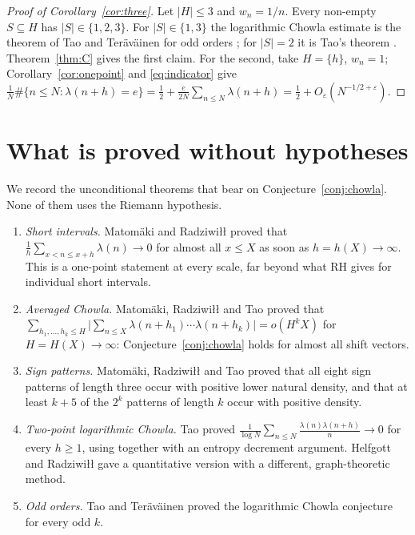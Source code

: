 \documentclass[11pt]{amsart}
\numberwithin{equation}{section}
\theoremstyle{plain}
\theoremstyle{definition}
\theoremstyle{remark}
\begin{document}
\begin{proof}[Proof of Corollary~\ref{cor:three}]
Let $|H|\le3$ and $w_n=1/n$. Every non-empty $S\subseteq H$ has $|S|\in\{1,2,3\}$. For $|S|\in\{1,3\}$ the logarithmic Chowla estimate is the theorem of Tao and Teräväinen for odd orders \cite{TT18,TT19}; for $|S|=2$ it is Tao's theorem \cite{Tao16}. Theorem~\ref{thm:C} gives the first claim. For the second, take $H=\{h\}$, $w_n=1$; Corollary~\ref{cor:onepoint} and \eqref{eq:indicator} give $\frac1N\#\{n\le N:\lambda(n+h)=e\}=\frac12+\frac e{2N}\sum_{n\le N}\lambda(n+h)=\frac12+O_\varepsilon(N^{-1/2+\varepsilon})$.
\end{proof}

\section{What is proved without hypotheses}\label{sec:uncond}

We record the unconditional theorems that bear on Conjecture~\ref{conj:chowla}. None of them uses the Riemann hypothesis.

\begin{enumerate}
\item \emph{Short intervals.} Matomäki and Radziwiłł \cite{MR16} proved that $\frac1h\sum_{x<n\le x+h}\lambda(n)\to0$ for almost all $x\le X$ as soon as $h=h(X)\to\infty$. This is a one-point statement at every scale, far beyond what RH gives for individual short intervals.
\item \emph{Averaged Chowla.} Matomäki, Radziwiłł and Tao \cite{MRT15} proved that $\sum_{h_1,\dots,h_k\le H}\big|\sum_{n\le X}\lambda(n+h_1)\cdots\lambda(n+h_k)\big|=o(H^kX)$ for $H=H(X)\to\infty$: Conjecture~\ref{conj:chowla} holds for almost all shift vectors.
\item \emph{Sign patterns.} Matomäki, Radziwiłł and Tao \cite{MRT16} proved that all eight sign patterns of length three occur with positive lower natural density, and that at least $k+5$ of the $2^k$ patterns of length $k$ occur with positive density.
\item \emph{Two-point logarithmic Chowla.} Tao \cite{Tao16} proved $\frac1{\log N}\sum_{n\le N}\frac{\lambda(n)\lambda(n+h)}n\to0$ for every $h\ge1$, using \cite{MR16} together with an entropy decrement argument. Helfgott and Radziwiłł \cite{HR21} gave a quantitative version with a different, graph-theoretic method.
\item \emph{Odd orders.} Tao and Teräväinen \cite{TT18,TT19} proved the logarithmic Chowla conjecture for every odd $k$.
\end{enumerate}
\end{document}
